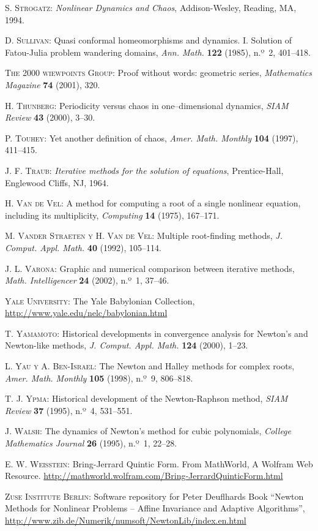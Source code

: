 \begin{thebibliography}{999}
\textsc{S. Strogatz}:
\textit{Nonlinear Dynamics and Chaos},
Addison-Wesley, Reading, MA, 1994.

\textsc{D. Sullivan}:
{Quasi conformal homeomorphisms and dynamics. I. Solution of Fatou-Julia problem wandering domains},
 \textit{Ann. Math.} \textbf{122} (1985), n.º~2, 401--418.

\textsc{The 2000 wiewpoints Group}:
 Proof without words: geometric series,
\textit{Mathematics Magazine} \textbf{74} (2001), 320.

\textsc{H. Thunberg}:
 Periodicity versus chaos in one--dimensional dynamics,
\textit{SIAM Review} \textbf{43} (2000), 3--30.

\textsc{P. Touhey}:
{Yet another definition of chaos},
\textit{Amer. Math. Monthly} \textbf{104} (1997),  411--415.


\textsc{J. F.  Traub}:
\textit{Iterative methods for the solution of equations}, Prentice-Hall,
Englewood Cliffs, NJ, 1964.

\textsc{H. Van de Vel}:
A method for computing a root of a single nonlinear equation, including its multiplicity,
\textit{Computing} \textbf{14} (1975),  167--171.

\textsc{M. Vander Straeten y H. Van de Vel}:
Multiple root-finding methods,
\textit{J. Comput. Appl. Math.} \textbf{40} (1992), 105--114.

\textsc{J. L. Varona}:
Graphic and numerical comparison between iterative methods,
\textit{Math. Intelligencer} \textbf{24} (2002), n.º~1, 37--46.

\textsc{Yale University}:
The Yale Babylonian Collection,
\url{http://www.yale.edu/nelc/babylonian.html}

\textsc{T. Yamamoto}:
Historical developments in convergence analysis for Newton's and Newton-like methods,
\textit{J. Comput. Appl. Math.} \textbf{124} (2000), 1--23.

\textsc{L. Yau y A. Ben-Israel}:
 The Newton and Halley methods for complex roots,
\textit{Amer. Math. Monthly}  \textbf{105} (1998), n.º~9, 806--818.

\textsc{T. J. Ypma}:
 Historical development of the Newton-Raphson method,
\textit{SIAM Review} \textbf{37} (1995), n.º~4, 531--551.

\textsc{J. Walsh}:
{The dynamics of Newton's method for cubic polynomials},
\textit{College Mathematics Journal}  \textbf{26} (1995), n.º~1, 22--28.

\textsc{E. W. Weisstein}:
Bring-Jerrard Quintic Form. From MathWorld, A Wolfram Web Resource.
\url{http://mathworld.wolfram.com/Bring-JerrardQuinticForm.html}


\textsc{Zuse Institute Berlin}:
Software repository for Peter Deuflhards Book
``Newton Methods for Nonlinear Problems -- Affine Invariance and Adaptive Algorithms'',
\url{http://www.zib.de/Numerik/numsoft/NewtonLib/index.en.html}


\end{thebibliography}
